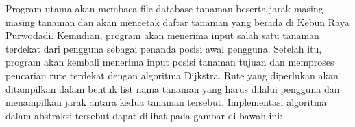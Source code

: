\documentclass[conference]{IEEEtran}
\begin{document}
    Program utama akan membaca file database tanaman beserta jarak masing-masing tanaman dan akan mencetak daftar tanaman yang berada di Kebun Raya Purwodadi. Kemudian, program akan menerima input salah satu tanaman terdekat dari pengguna sebagai penanda posisi awal pengguna. Setelah itu, program akan kembali menerima input posisi tanaman tujuan dan memproses pencarian rute terdekat dengan algoritma Dijkstra. Rute yang diperlukan akan ditampilkan dalam bentuk list nama tanaman yang harus dilalui pengguna dan menampilkan jarak antara kedua tanaman tersebut. Implementasi algoritma dalam abstraksi tersebut dapat dilihat pada gambar di bawah ini:



\end{document}
